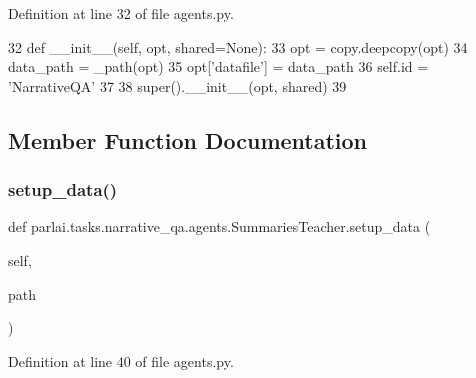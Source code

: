Definition at line 32 of file agents.\+py.


\begin{DoxyCode}
32     \textcolor{keyword}{def }\_\_init\_\_(self, opt, shared=None):
33         opt = copy.deepcopy(opt)
34         data\_path = \_path(opt)
35         opt[\textcolor{stringliteral}{'datafile'}] = data\_path
36         self.id = \textcolor{stringliteral}{'NarrativeQA'}
37 
38         super().\_\_init\_\_(opt, shared)
39 
\end{DoxyCode}


\subsection{Member Function Documentation}
\mbox{\label{classparlai_1_1tasks_1_1narrative__qa_1_1agents_1_1SummariesTeacher_a76f9cadca71b61d42c5997ba590f107e}} 
\subsubsection{\texorpdfstring{setup\+\_\+data()}{setup\_data()}}
{\footnotesize\ttfamily def parlai.\+tasks.\+narrative\+\_\+qa.\+agents.\+Summaries\+Teacher.\+setup\+\_\+data (\begin{DoxyParamCaption}\item[{}]{self,  }\item[{}]{path }\end{DoxyParamCaption})}



Definition at line 40 of file agents.\+py.


